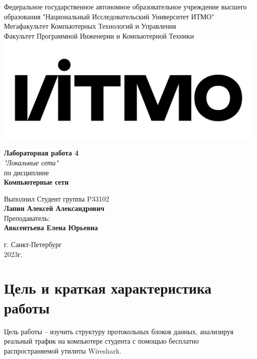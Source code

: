 \documentclass[12pt,onecolumn]{article}
\begin{document}
\setcounter{tocdepth}{4}
\begin{center}
    Федеральное государственное автономное образовательное учреждение высшего образования "Национальный Исследовательский Университет ИТМО"\\ 
    Мегафакультет Компьютерных Технологий и Управления\\
    Факультет Программной Инженерии и Компьютерной Техники \\
    \includegraphics[scale=0.3]{image/itmo.jpg} %
\end{center}
\vspace{1cm}


\begin{center}
    \textbf{Лабораторная работа 4}\\
    \textit{"Локальные сети"}\\
    по дисциплине\\
    \textbf{Компьютерные сети}
\end{center}

\vspace{2cm}

\begin{flushright}
  Выполнил Студент  группы P33102\\
  \textbf{Лапин Алексей Александрович}\\
  Преподаватель: \\
  \textbf{Авксентьева Елена Юрьевна}\\
\end{flushright}

\vspace{6cm}
\begin{center}
    г. Санкт-Петербург\\
    2023г.
\end{center}

\newpage
\tableofcontents
\newpage

\section*{Цель и краткая характеристика работы}
Цель работы – изучить структуру протокольных блоков данных, анализируя реальный трафик на компьютере студента с помощью бесплатно распространяемой утилиты Wireshark.
\end{document}
